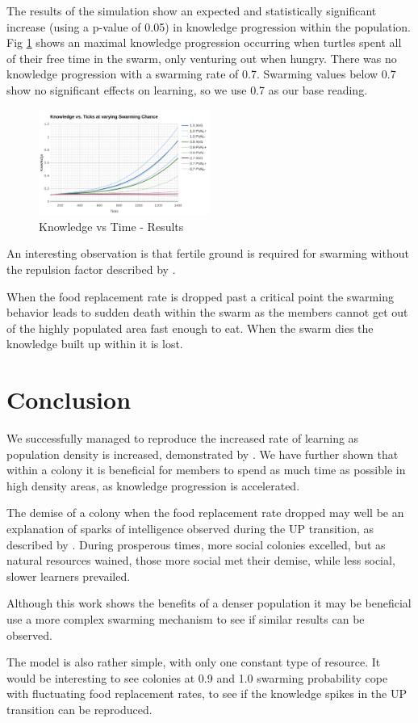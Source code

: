 \documentclass[a4paper,12pt,twocolumn]{report}
\begin{document}
The results of the simulation show an expected and statistically significant increase (using a p-value of 0.05) in knowledge progression within the population. Fig \ref{fig:table} shows an maximal knowledge progression occurring when turtles spent all of their free time in the swarm, only venturing out when hungry. There was no knowledge progression with a swarming rate of 0.7. Swarming values below 0.7 show no significant effects on learning, so we use 0.7 as our base reading.

\begin{figure}[b]
 \includegraphics[width=0.5\textwidth]{swarming-effect}
 \caption{Knowledge vs Time - Results}
 \label{fig:table}
\end{figure}

An interesting observation is that fertile ground is required for swarming without the repulsion factor described by \cite{agueh2011analysis}.

When the food replacement rate is dropped past a critical point the swarming behavior leads to sudden death within the swarm as the members cannot get out of the highly populated area fast enough to eat. When the swarm dies the knowledge built up within it is lost.

\section{Conclusion}

We successfully managed to reproduce the increased rate of learning as population density is increased, demonstrated by \cite{powell2009late}. We have further shown that within a colony it is beneficial for members to spend as much time as possible in high density areas, as knowledge progression is accelerated.

The demise of a colony when the food replacement rate dropped may well be an explanation of sparks of intelligence observed during the UP transition, as described by \cite{powell2009late}. During prosperous times, more social colonies excelled, but as natural resources wained, those more social met their demise, while less social, slower learners prevailed.

Although this work shows the benefits of a denser population it may be beneficial use a more complex swarming mechanism to see if similar results can be observed.

The model is also rather simple, with only one constant type of resource. It would be interesting to see colonies at 0.9 and 1.0 swarming probability cope with fluctuating food replacement rates, to see if the knowledge spikes in the UP transition can be reproduced. 


\end{document}
